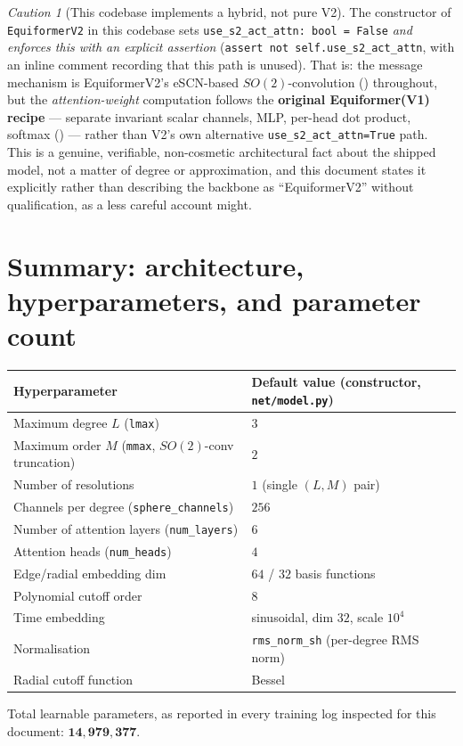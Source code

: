 \documentclass[11pt,a4paper]{report}
\theoremstyle{definition}
\theoremstyle{remark}
\newtheorem{caution}[caution]{Caution}
\newcommand{\file}[1]{\texttt{#1}}
\newcommand{\pyfunc}[1]{\texttt{#1}}
\begin{document}
\begin{caution}[This codebase implements a hybrid, not pure V2]
\label{caution:hybrid-architecture}
The constructor of \pyfunc{EquiformerV2} in this codebase sets
\texttt{use\_s2\_act\_attn: bool = False} \emph{and enforces this with an
explicit assertion} (\texttt{assert not self.use\_s2\_act\_attn}, with an
inline comment recording that this path is unused). That is: the message
mechanism is EquiformerV2's eSCN-based $SO(2)$-convolution
() throughout, but the \emph{attention-weight}
computation follows the \textbf{original Equiformer(V1) recipe} ---
separate invariant scalar channels, MLP, per-head dot product, softmax
() --- rather than V2's own alternative
\texttt{use\_s2\_act\_attn=True} path. This is a genuine, verifiable,
non-cosmetic architectural fact about the shipped model, not a matter of
degree or approximation, and this document states it explicitly rather
than describing the backbone as ``EquiformerV2'' without qualification, as
a less careful account might.
\end{caution}

\section{Summary: architecture, hyperparameters, and parameter count}
\label{sec:equiformer-summary}

\begin{center}
\begin{tabular}{@{}ll@{}}
\toprule
Hyperparameter & Default value (constructor, \file{net/model.py}) \\
\midrule
Maximum degree $L$ (\texttt{lmax}) & $3$ \\
Maximum order $M$ (\texttt{mmax}, $SO(2)$-conv truncation) & $2$ \\
Number of resolutions & $1$ (single $(L,M)$ pair) \\
Channels per degree (\texttt{sphere\_channels}) & $256$ \\
Number of attention layers (\texttt{num\_layers}) & $6$ \\
Attention heads (\texttt{num\_heads}) & $4$ \\
Edge/radial embedding dim & $64$ / $32$ basis functions \\
Polynomial cutoff order & $8$ \\
Time embedding & sinusoidal, dim $32$, scale $10^4$ \\
Normalisation & \texttt{rms\_norm\_sh} (per-degree RMS norm) \\
Radial cutoff function & Bessel \\
\bottomrule
\end{tabular}
\end{center}
Total learnable parameters, as reported in every training log inspected
for this document: $\mathbf{14{,}979{,}377}$.
\end{document}
